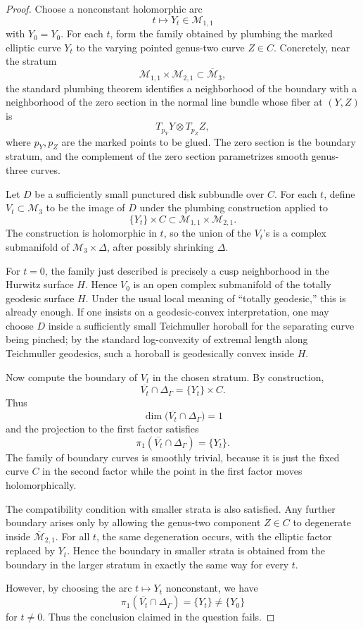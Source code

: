 \documentclass[11pt]{article}
\newcommand{\DeltaG}{\Delta_{\Gamma}}
\begin{document}
\begin{proof}
Choose a nonconstant holomorphic arc
\[
t \longmapsto Y_t \in \mathcal M_{1,1}
\]
with \(Y_{0}=Y_0\).  For each \(t\), form the family obtained by plumbing the
marked elliptic curve \(Y_t\) to the varying pointed genus-two curve \(Z\in C\).
Concretely, near the stratum
\[
\mathcal M_{1,1}\times \mathcal M_{2,1}\subset \overline{\mathcal M}_3,
\]
the standard plumbing theorem identifies a neighborhood of the boundary with a
neighborhood of the zero section in the normal line bundle whose fiber at
\((Y,Z)\) is
\[
T_{p_Y}Y\otimes T_{p_Z}Z,
\]
where \(p_Y,p_Z\) are the marked points to be glued.  The zero section is the
boundary stratum, and the complement of the zero section parametrizes smooth
genus-three curves.

Let \(D\) be a sufficiently small punctured disk subbundle over \(C\).  For each
\(t\), define \(V_t\subset \mathcal M_3\) to be the image of \(D\) under the
plumbing construction applied to
\[
\{Y_t\}\times C \subset \mathcal M_{1,1}\times \mathcal M_{2,1}.
\]
The construction is holomorphic in \(t\), so the union of the \(V_t\)'s is a
complex submanifold of \(\mathcal M_3\times \Delta\), after possibly shrinking
\(\Delta\).

For \(t=0\), the family just described is precisely a cusp neighborhood in the
Hurwitz surface \(H\).  Hence \(V_0\) is an open complex submanifold of the
totally geodesic surface \(H\).  Under the usual local meaning of ``totally
geodesic,'' this is already enough.  If one insists on a geodesic-convex
interpretation, one may choose \(D\) inside a sufficiently small Teichmuller
horoball for the separating curve being pinched; by the standard log-convexity
of extremal length along Teichmuller geodesics, such a horoball is geodesically
convex inside \(H\).

Now compute the boundary of \(V_t\) in the chosen stratum.  By construction,
\[
\overline{V_t}\cap \DeltaG
=
\{Y_t\}\times C.
\]
Thus
\[
\dim\bigl(\overline{V_t}\cap\DeltaG\bigr)=1
\]
and the projection to the first factor satisfies
\[
\pi_1(\overline{V_t}\cap \DeltaG)=\{Y_t\}.
\]
The family of boundary curves is smoothly trivial, because it is just the fixed
curve \(C\) in the second factor while the point in the first factor moves
holomorphically.

The compatibility condition with smaller strata is also satisfied.  Any further
boundary arises only by allowing the genus-two component \(Z\in C\) to degenerate
inside \(\overline{\mathcal M}_{2,1}\).  For all \(t\), the same degeneration
occurs, with the elliptic factor replaced by \(Y_t\).  Hence the boundary in
smaller strata is obtained from the boundary in the larger stratum in exactly
the same way for every \(t\).

However, by choosing the arc \(t\mapsto Y_t\) nonconstant, we have
\[
\pi_1(\overline{V_t}\cap \DeltaG)=\{Y_t\}\neq \{Y_0\}
\]
for \(t\neq 0\).  Thus the conclusion claimed in the question fails.
\end{proof}
\end{document}
